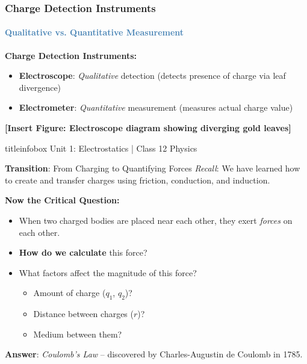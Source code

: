 \begin{frame}
\frametitle{\textsf{\textbf{Charge Detection Instruments}}}
\framesubtitle{\textcolor{steelblue}{Qualitative vs. Quantitative Measurement}}

\vspace{0.2cm}
\textbf{\large Charge Detection Instruments:}
\begin{itemize}
	\item \textbf{Electroscope}: \textit{Qualitative} detection (detects presence of charge via leaf divergence)
	\item \textbf{Electrometer}: \textit{Quantitative} measurement (measures actual charge value)
\end{itemize}

\vspace{0.3cm}
\textbf{[Insert Figure: Electroscope diagram showing diverging gold leaves]}

\vfill

\begin{beamercolorbox}[wd=\textwidth,ht=0.5cm,dp=0.1cm,center]{titleinfobox}
    \small\color{coolgray} Unit 1: Electrostatics | Class 12 Physics
\end{beamercolorbox}
\end{frame}

\begin{frame}{\textbf{Transition}: From Charging to Quantifying Forces}
\textit{Recall}: We have learned how to create and transfer charges using friction, conduction, and induction.

\vspace{0.3cm}
\textbf{\large Now the Critical Question:}
\begin{itemize}
	\item When two charged bodies are placed near each other, they exert \textit{forces} on each other.
	\item \textbf{How do we calculate} this force?
	\item What factors affect the magnitude of this force?
		\begin{itemize}
			\item Amount of charge ($q_1$, $q_2$)?
			\item Distance between charges ($r$)?
			\item Medium between them?
		\end{itemize}
\end{itemize}

\vspace{0.2cm}
\textbf{Answer}: \textit{Coulomb's Law} -- discovered by Charles-Augustin de Coulomb in 1785.
\end{frame}

